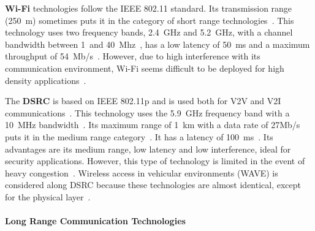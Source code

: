 \textbf{\acrfull{Wi-Fi}} technologies follow the IEEE 802.11 standard. Its transmission range (250~m) sometimes puts it in the category of short range technologies~\cite{araniti_lte_2013,anwer_survey_2014}. This technology uses two frequency bands, 2.4~GHz and 5.2~GHz, with a channel bandwidth between 1~and 40~Mhz~\cite{papadimitratos_vehicular_2009}, has a low latency of 50~ms and a maximum throughput of 54~Mb/s~\cite{ahangar_survey_2021}. However, due to high interference with its communication environment, Wi-Fi seems difficult to be deployed for high density applications~\cite{chen_lte-v_2016}.

The \textbf{\acrfull{DSRC}} is based on IEEE 802.11p and is used both for \acrshort{V2V} and \acrshort{V2I} communications~\cite{ahangar_survey_2021}. This technology uses the 5.9~GHz frequency band with a 10~MHz bandwidth~\cite{ghosal_security_2020}. 
Its maximum range of 1~km with a data rate of 27Mb/s puts it in the medium range category~\cite{anwer_survey_2014}. It has a latency of 100~ms~\cite{ahangar_survey_2021}. Its advantages are its medium range, low latency and low interference, ideal for security applications. However, this type of technology is limited in the event of heavy congestion~\cite{cailean_survey_2014}. Wireless access in vehicular environments (WAVE) is considered along \acrshort{DSRC} because these technologies are almost identical, except for the physical layer~\cite{ghosal_security_2020}.

\paragraph{Long Range Communication Technologies}\ \\

